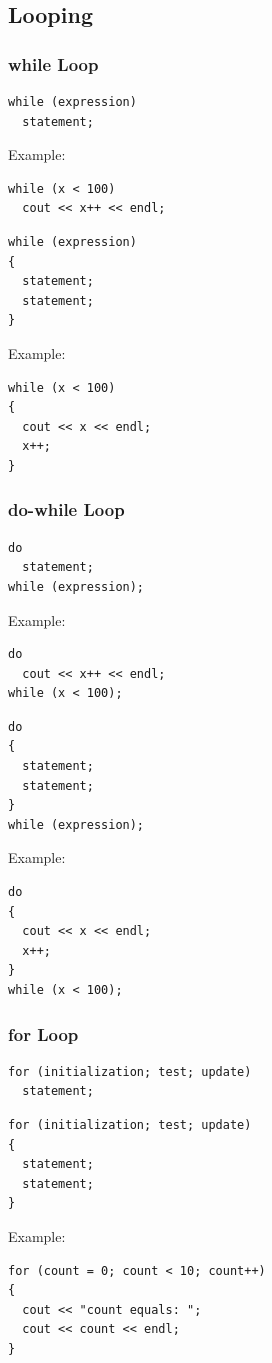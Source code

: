 \documentclass{article}
\begin{document}
\subsection*{Looping}

\subsubsection*{while Loop}
\begin{verbatim}
while (expression)
  statement;
\end{verbatim}
Example:
\begin{verbatim}
while (x < 100)
  cout << x++ << endl;
\end{verbatim}
\begin{verbatim}
while (expression)
{
  statement;
  statement;
}
\end{verbatim}
Example:
\begin{verbatim}
while (x < 100)
{
  cout << x << endl;
  x++;
}
\end{verbatim}

\subsubsection*{do-while Loop}
\begin{verbatim}
do
  statement;
while (expression);
\end{verbatim}
Example:
\begin{verbatim}
do
  cout << x++ << endl;
while (x < 100);
\end{verbatim}
\begin{verbatim}
do
{
  statement;
  statement;
}
while (expression);
\end{verbatim}
Example:
\begin{verbatim}
do
{
  cout << x << endl;
  x++;
}
while (x < 100);
\end{verbatim}

\subsubsection*{for Loop}
\begin{verbatim}
for (initialization; test; update)
  statement;
\end{verbatim}
\begin{verbatim}
for (initialization; test; update)
{
  statement;
  statement;
}
\end{verbatim}
Example:
\begin{verbatim}
for (count = 0; count < 10; count++)
{
  cout << "count equals: ";
  cout << count << endl;
}
\end{verbatim}
\end{document}
